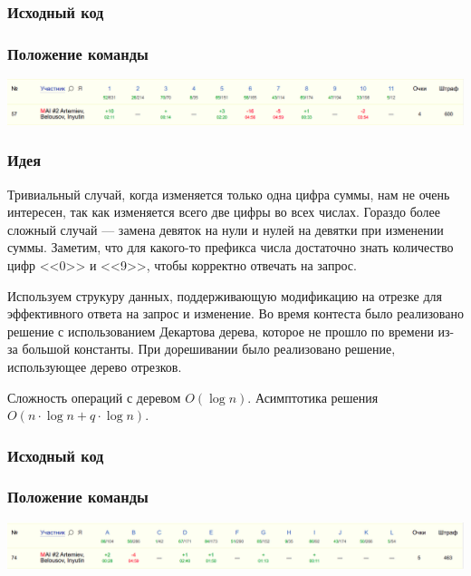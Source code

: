 \documentclass[12pt]{article}
\begin{document}
\subsubsection*{Исходный код}

\subsubsection*{Положение команды}
\includegraphics[scale=0.25]{images/gp_siberia.png}\newline\noindent
\pagebreak


\subsubsection*{Идея}
Тривиальный случай, когда изменяется только одна цифра суммы, нам не очень интересен, так как изменяется всего две цифры во всех числах. Гораздо более сложный случай --- замена девяток на нули и нулей на девятки при изменении суммы. Заметим, что для какого-то префикса числа достаточно знать количество цифр <<0>> и <<9>>, чтобы корректно отвечать на запрос.

Используем струкуру данных, поддерживающую модификацию на отрезке для эффективного ответа на запрос и изменение. Во время контеста было реализовано решение с использованием Декартова дерева, которое не прошло по времени из-за большой константы. При дорешивании было реализовано решение, использующее дерево отрезков.

Сложность операций с деревом $O(\log{n})$. Асимптотика решения $O(n \cdot \log{n} + q \cdot \log{n})$.

\subsubsection*{Исходный код}

\subsubsection*{Положение команды}
\includegraphics[scale=0.25]{images/gp_edg.png}\newline\noindent
\pagebreak
\end{document}

